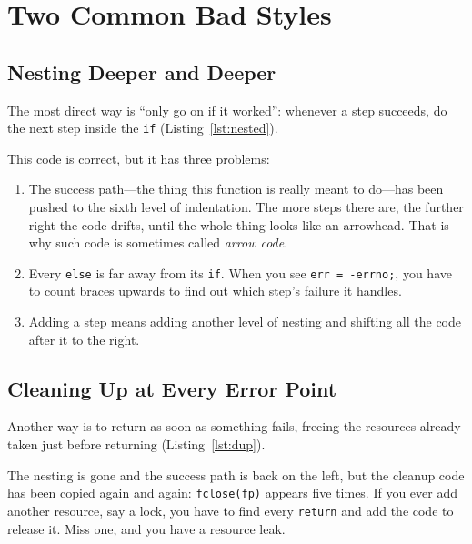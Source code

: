 \section{Two Common Bad Styles}

\subsection{Nesting Deeper and Deeper}

The most direct way is ``only go on if it worked'': whenever a step succeeds, do the next step inside the \texttt{if} (Listing~\ref{lst:nested}).


This code is correct, but it has three problems:
\begin{enumerate}
  \item The success path---the thing this function is really meant to do---has been pushed to the sixth level of indentation. The more steps there are, the further right the code drifts, until the whole thing looks like an arrowhead. That is why such code is sometimes called \emph{arrow code}.
  \item Every \texttt{else} is far away from its \texttt{if}. When you see \texttt{err = -errno;}, you have to count braces upwards to find out which step's failure it handles.
  \item Adding a step means adding another level of nesting and shifting all the code after it to the right.
\end{enumerate}

\subsection{Cleaning Up at Every Error Point}

Another way is to return as soon as something fails, freeing the resources already taken just before returning (Listing~\ref{lst:dup}).


The nesting is gone and the success path is back on the left, but the cleanup code has been copied again and again: \texttt{fclose(fp)} appears five times. If you ever add another resource, say a lock, you have to find every \texttt{return} and add the code to release it. Miss one, and you have a resource leak.

